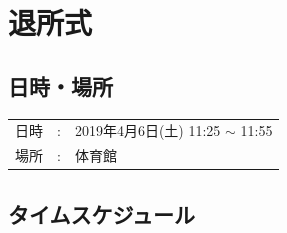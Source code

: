 %

\section{退所式}

\subsection{日時・場所}
\begin{tabular}{p{}rp{}}
  日時 & : & 2019年4月6日(土) 11:25 $\sim$ 11:55\\
  場所 & : & 体育館
\end{tabular}

\subsection{タイムスケジュール}
